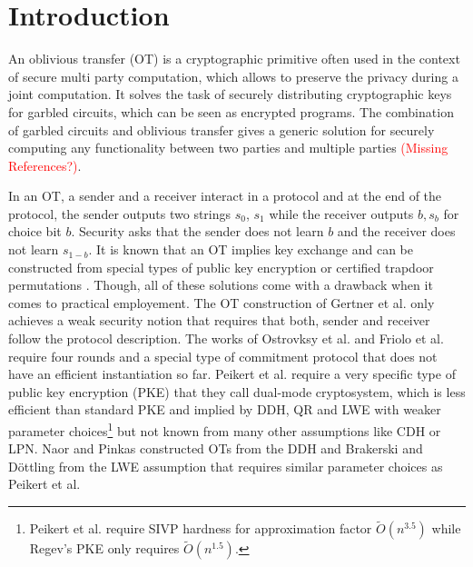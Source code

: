 \newcommand{\msng}{\textcolor{red}{(Missing References?)}}

\section{Introduction}

An oblivious transfer (OT) \cite{Rabin81,C:EveGolLem82} is a cryptographic primitive often used in the context of secure multi party computation, which allows to preserve the privacy during a joint computation. It solves the task of securely distributing cryptographic keys for garbled circuits, which can be seen as encrypted programs. The combination of garbled circuits and oblivious transfer gives a generic solution for securely computing any functionality between two parties \cite{FOCS:Yao82b,FOCS:Yao86,STOC:Kilian88,C:IshPraSah08} and multiple parties \cite{C:CreVanTap95,EC:BenLin18,EC:GarSri18a} \msng.  

In an OT, a sender and a receiver interact in a protocol and at the end of the protocol, the sender outputs two strings $s_0$, $s_1$ while the receiver outputs $b, s_b$ for choice bit $b$. Security asks that the sender does not learn $b$ and the receiver does not learn $s_{1-b}$. It is known that an OT implies key exchange and can be constructed from special types of public key encryption \cite{FOCS:GKMRV00,C:PeiVaiWat08,cryptoeprint:2018:473} or certified trapdoor permutations \cite{C:OstRicSca15}. Though, all of these solutions come with a drawback when it comes to practical employement. The OT construction of Gertner et al. \cite{FOCS:GKMRV00} only achieves a weak security notion that requires that both, sender and receiver follow the protocol description. The works of Ostrovksy et al. \cite{C:OstRicSca15} and Friolo et al. \cite{cryptoeprint:2018:473} require four rounds and a special type of commitment protocol \cite{STOC:Kilian92,C:OstRicSca15} that does not have an efficient instantiation so far. Peikert et al. \cite{C:PeiVaiWat08} require a very specific type of public key encryption (PKE) that they call dual-mode cryptosystem, which is less efficient than standard PKE and implied by DDH, QR and LWE with weaker parameter choices\footnote{Peikert et al. require SIVP hardness for approximation factor $\tilde{O}(n^{3.5})$ while Regev's PKE \cite{STOC:Regev05} only requires $\tilde{O}(n^{1.5})$.} but not known from many other assumptions like CDH or LPN. Naor and Pinkas \cite{SODA:NaoPin01} constructed OTs from the DDH and Brakerski and D\"ottling \cite{TCC:BraDot18} from the LWE assumption that requires similar parameter choices as Peikert et al.

